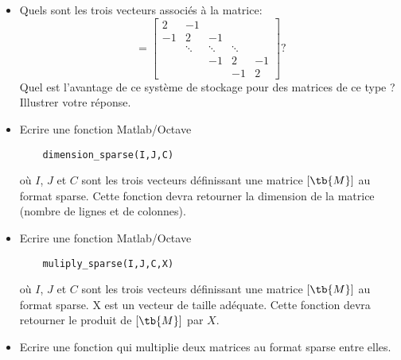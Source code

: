 \begin{itemize}
	\item Quels sont les trois vecteurs associés à la matrice:
\begin{equation}
	[\tb{M}_1]=\begin{bmatrix}
		2 & -1 \\
		-1&2 &-1\\
		&\ddots&\ddots &\ddots \\
		&&-1&2&-1\\
		 &&&-1&2
	\end{bmatrix}?
\end{equation}
Quel est l'avantage de ce système de stockage pour des matrices de ce type ? Illustrer votre réponse.
\item Ecrire une fonction Matlab/Octave
\begin{verbatim}
	dimension_sparse(I,J,C)
\end{verbatim}
où $I$, $J$ et $C$ sont les trois vecteurs définissant une matrice $[\tb{M}]$ au format sparse. Cette fonction devra retourner la dimension de la matrice (nombre de lignes et de colonnes). 
\item Ecrire une fonction Matlab/Octave
\begin{verbatim}
	muliply_sparse(I,J,C,X)
\end{verbatim}
où $I$, $J$ et $C$ sont les trois vecteurs définissant une matrice $[\tb{M}]$ au format sparse. X est un vecteur de taille adéquate. Cette fonction devra retourner le produit de $[\tb{M}]$ par ${X}$.
\item Ecrire une fonction qui multiplie deux matrices au format sparse entre elles.
\end{itemize}




\eexo
\solution{
}
